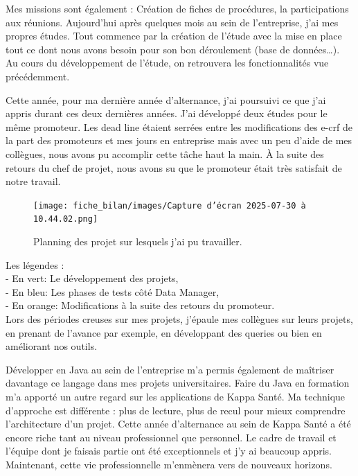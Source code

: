 Mes missions sont également :
Création de fiches de procédures, la participations aux réunions. 
Aujourd’hui après quelques mois au sein de l’entreprise, j’ai mes propres
études. Tout commence par la création de l’étude avec la mise en place tout ce
dont nous avons besoin pour son bon déroulement (base de données…). Au
cours du développement de l’étude, on retrouvera les fonctionnalités vue
précédemment.

\vspace{0.5cm}
Cette année, pour ma dernière année d'alternance, j'ai poursuivi ce que j'ai appris durant ces deux dernières années. J'ai développé deux études pour le même promoteur. Les dead line étaient serrées entre les modifications des e-crf de la part des promoteurs et mes jours en entreprise mais avec un peu d'aide de mes collègues, nous avons pu accomplir cette tâche haut la main. À la suite des retours du chef de projet, nous avons su que le promoteur était très satisfait de notre travail. 
\begin{figure}[H]
    \centering
    \texttt{[image: fiche\_bilan/images/Capture d’écran 2025-07-30 à 10.44.02.png]} 
    \caption{Planning des projet sur lesquels j'ai pu travailler.}
\end{figure}
Les légendes :\\
- En vert: Le développement des projets,\\
- En bleu: Les phases de tests côté Data Manager,\\
- En orange: Modifications à la suite des retours du promoteur.\\
Lors des périodes creuses sur mes projets, j'épaule mes collègues sur leurs projets, en prenant de l'avance par exemple, en développant des queries ou bien en améliorant nos outils.

\vspace{0.5cm}
Développer en Java au sein de l’entreprise m’a permis également de maîtriser davantage ce langage dans mes projets universitaires. Faire du Java en formation m’a apporté un autre regard sur les applications de Kappa Santé. Ma technique d’approche est différente : plus de lecture, plus de recul pour mieux comprendre l’architecture d’un projet. 
Cette année d’alternance au sein de Kappa Santé a été encore riche tant au niveau professionnel que personnel.
Le cadre de travail et l’équipe dont je faisais partie ont été exceptionnels et j’y ai beaucoup appris. Maintenant, cette vie professionnelle m'enmènera vers de nouveaux horizons.
